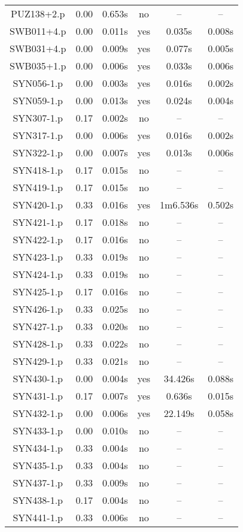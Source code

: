 \begin{center}
\begin{longtable}{||c | c | c | c | c | c||}
PUZ138+2.p & 0.00 & 0.653s & no & -- & -- \\
SWB011+4.p & 0.00 & 0.011s & yes & 0.035s & 0.008s \\
SWB031+4.p & 0.00 & 0.009s & yes & 0.077s & 0.005s \\
SWB035+1.p & 0.00 & 0.006s & yes & 0.033s & 0.006s \\
SYN056-1.p & 0.00 & 0.003s & yes & 0.016s & 0.002s \\
SYN059-1.p & 0.00 & 0.013s & yes & 0.024s & 0.004s \\
SYN307-1.p & 0.17 & 0.002s & no & -- & -- \\
SYN317-1.p & 0.00 & 0.006s & yes & 0.016s & 0.002s \\
SYN322-1.p & 0.00 & 0.007s & yes & 0.013s & 0.006s \\
SYN418-1.p & 0.17 & 0.015s & no & -- & -- \\
SYN419-1.p & 0.17 & 0.015s & no & -- & -- \\
SYN420-1.p & 0.33 & 0.016s & yes & 1m6.536s & 0.502s \\
SYN421-1.p & 0.17 & 0.018s & no & -- & -- \\
SYN422-1.p & 0.17 & 0.016s & no & -- & -- \\
SYN423-1.p & 0.33 & 0.019s & no & -- & -- \\
SYN424-1.p & 0.33 & 0.019s & no & -- & -- \\
SYN425-1.p & 0.17 & 0.016s & no & -- & -- \\
SYN426-1.p & 0.33 & 0.025s & no & -- & -- \\
SYN427-1.p & 0.33 & 0.020s & no & -- & -- \\
SYN428-1.p & 0.33 & 0.022s & no & -- & -- \\
SYN429-1.p & 0.33 & 0.021s & no & -- & -- \\
SYN430-1.p & 0.00 & 0.004s & yes & 34.426s & 0.088s \\
SYN431-1.p & 0.17 & 0.007s & yes & 0.636s & 0.015s \\
SYN432-1.p & 0.00 & 0.006s & yes & 22.149s & 0.058s \\
SYN433-1.p & 0.00 & 0.010s & no & -- & -- \\
SYN434-1.p & 0.33 & 0.004s & no & -- & -- \\
SYN435-1.p & 0.33 & 0.004s & no & -- & -- \\
SYN437-1.p & 0.33 & 0.009s & no & -- & -- \\
SYN438-1.p & 0.17 & 0.004s & no & -- & -- \\
SYN441-1.p & 0.33 & 0.006s & no & -- & -- \\

\end{longtable}
\end{center}

